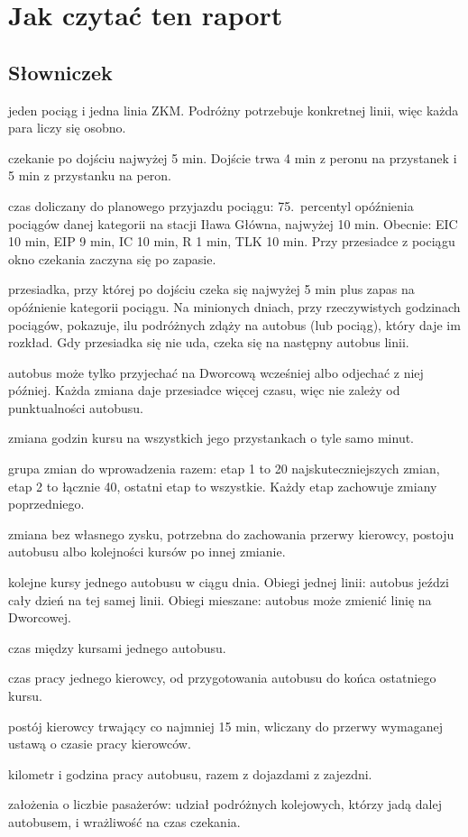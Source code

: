\documentclass[10pt,a4paper]{article}
\begin{document}
\section*{Jak czytać ten raport}
\subsection*{Słowniczek}
\begin{description}[itemsep=1pt, leftmargin=0pt]
\item[Para pociąg--linia] jeden pociąg i jedna linia ZKM. Podróżny potrzebuje konkretnej linii, więc każda para liczy się osobno.
\item[Dobra przesiadka] czekanie po dojściu najwyżej 5 min. Dojście trwa 4 min z peronu na przystanek i 5 min z przystanku na peron.
\item[Zapas na opóźnienie] czas doliczany do planowego przyjazdu pociągu: 75.\ percentyl opóźnienia pociągów danej kategorii na stacji Iława Główna, najwyżej 10 min. Obecnie: EIC 10 min, EIP 9 min, IC 10 min, R 1 min, TLK 10 min. Przy przesiadce z pociągu okno czekania zaczyna się po zapasie.
\item[Złapana przesiadka] przesiadka, przy której po dojściu czeka się najwyżej 5 min plus zapas na opóźnienie kategorii pociągu. Na minionych dniach, przy rzeczywistych godzinach pociągów, pokazuje, ilu podróżnych zdąży na autobus (lub pociąg), który daje im rozkład. Gdy przesiadka się nie uda, czeka się na następny autobus linii.
\item[Kierunek przesunięć] autobus może tylko przyjechać na Dworcową wcześniej albo odjechać z niej później. Każda zmiana daje przesiadce więcej czasu, więc nie zależy od punktualności autobusu.
\item[Przesunięcie kursu] zmiana godzin kursu na wszystkich jego przystankach o tyle samo minut.
\item[Etap] grupa zmian do wprowadzenia razem: etap 1 to 20 najskuteczniejszych zmian, etap 2 to łącznie 40, ostatni etap to wszystkie. Każdy etap zachowuje zmiany poprzedniego.
\item[Zmiana towarzysząca] zmiana bez własnego zysku, potrzebna do zachowania przerwy kierowcy, postoju autobusu albo kolejności kursów po innej zmianie.
\item[Obieg] kolejne kursy jednego autobusu w ciągu dnia. Obiegi jednej linii: autobus jeździ cały dzień na tej samej linii. Obiegi mieszane: autobus może zmienić linię na Dworcowej.
\item[Postój] czas między kursami jednego autobusu.
\item[Służba] czas pracy jednego kierowcy, od przygotowania autobusu do końca ostatniego kursu.
\item[Przerwa] postój kierowcy trwający co najmniej 15 min, wliczany do przerwy wymaganej ustawą o czasie pracy kierowców.
\item[Wozokilometr, wozogodzina] kilometr i godzina pracy autobusu, razem z dojazdami z zajezdni.
\item[Wariant ostrożny, średni, optymistyczny] założenia o liczbie pasażerów: udział podróżnych kolejowych, którzy jadą dalej autobusem, i wrażliwość na czas czekania.
\end{description}
\end{document}
